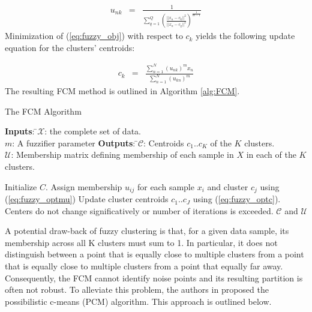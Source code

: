 \documentclass[12pt,dvips]{report}
\numberwithin{equation}{section}
\begin{document}
\begin{eqnarray}  \label{eq:fuzzy_optmu}
u_{nk}  & = & \frac{1}{\sum_{q=1}^{Q}(\frac{\vert \vert x_{n}-c_{k}\vert \vert ^{2}}{\vert \vert x_{n}-c_{q}\vert \vert ^{2}})^{\frac{1}{m-1}}}
\end{eqnarray} Minimization of (\ref{eq:fuzzy_obj}) with respect to $c_{k}$  yields the following update equation for the clusters' centroids:

\begin{eqnarray}  \label{eq:fuzzy_optc}
c_{k}  & = & \frac{\sum_{n=1}^{N}(u_{nk})^{m}x_{n}}{\sum_{n=1}^{N}(u_{kn})^{m}}
\end{eqnarray}  The resulting FCM method is outlined in Algorithm \ref{alg:FCM}.

\begin{algorithm}
  \caption{The FCM Algorithm}
  \label{alg:FCM}
  {\begin{tabbing}
  \textbf{Inputs}: \=$\mathcal{X}$: the complete set of data.\\
   \>$m$: A fuzzifier parameter
   \textbf{Outputs}: \=$\mathcal{C}$: Centroids $c_{1}..c_{K}$ of the $K$ clusters.\\
   \>$\mathcal{U}$: Membership matrix defining membership of each sample in $X$ in each of the $K$ clusters.\\
   \end{tabbing}}
  \begin{algorithmic}
    \STATE Initialize $C$.
    \REPEAT 
       \STATE Assign membership $u_{ij}$ for each sample $x_{i}$ and cluster $c_{j}$ using (\ref{eq:fuzzy_optmu})
       \STATE Update cluster centroids $c_{1}..c_{J}$ using (\ref{eq:fuzzy_optc}).
    \UNTIL Centers do not change significatively or number of iterations is exceeded.
    \RETURN $\mathcal{C}$ and $\mathcal{U}$
  \end{algorithmic}
\end{algorithm}

A potential draw-back of fuzzy clustering is that, for a given data sample, its membership across all K clusters must sum to 1.  In particular, it does not distinguish between a point that is equally close to multiple clusters from a point that is equally close to multiple clusters from a point that equally far away.  Consequently, the FCM cannot identify noise points and its resulting partition is often not robust.  To alleviate this problem, the authors in  \cite{PCM, FriguiShell} proposed the possibilistic c-means (PCM) algorithm.  This approach is outlined below.  
\end{document}
